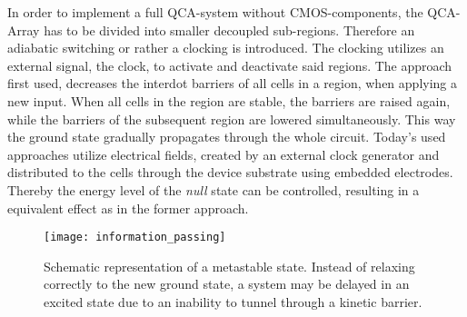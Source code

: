 In order to implement a full QCA-system without CMOS-components, the QCA-Array has to be divided into smaller decoupled sub-regions. Therefore an adiabatic switching or rather a clocking is introduced. The clocking utilizes an external signal, the clock, to activate and deactivate said regions. The approach first used, decreases the interdot barriers of all cells in a region, when applying a new input. When all cells in the region are stable, the barriers are raised again, while the barriers of the subsequent region are lowered simultaneously. This way the ground state gradually propagates through the whole circuit. Today's used approaches utilize electrical fields, created by an
external clock generator and distributed to the cells through the device substrate
using embedded electrodes. Thereby the energy level of the \textit{null} state can be controlled, resulting in a equivalent effect as in the former approach.

\begin{figure}
	\centering
	\texttt{[image: information\_passing]}
	\caption{Schematic representation of a metastable state. Instead
		of relaxing correctly to the new ground state, a system may be
		delayed in an excited state due to an inability to tunnel through a
		kinetic barrier.} 
	\label{fig:info_pass}
\end{figure}

